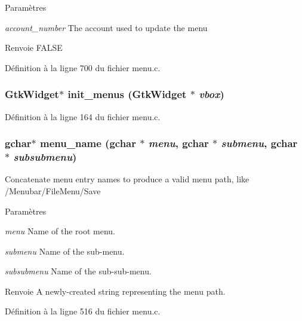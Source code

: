 \begin{DoxyParams}{Paramètres}
\item[{\em account\_\-number}]The account used to update the menu\end{DoxyParams}
\begin{DoxyReturn}{Renvoie}
FALSE 
\end{DoxyReturn}


Définition à la ligne 700 du fichier menu.c.

\subsubsection[{init\_\-menus}]{\setlength{\rightskip}{0pt plus 5cm}GtkWidget$\ast$ init\_\-menus (GtkWidget $\ast$ {\em vbox})}\label{menu_8h_a797e59b4900aa4af71181ca9b7145aa4}


Définition à la ligne 164 du fichier menu.c.

\subsubsection[{menu\_\-name}]{\setlength{\rightskip}{0pt plus 5cm}gchar$\ast$ menu\_\-name (gchar $\ast$ {\em menu}, \/  gchar $\ast$ {\em submenu}, \/  gchar $\ast$ {\em subsubmenu})}\label{menu_8h_a8bf02c2e8820e600ffa71a0ef9f6cce8}
Concatenate menu entry names to produce a valid menu path, like /Menubar/FileMenu/Save


\begin{DoxyParams}{Paramètres}
\item[{\em menu}]Name of the root menu. \item[{\em submenu}]Name of the sub-\/menu. \item[{\em subsubmenu}]Name of the sub-\/sub-\/menu.\end{DoxyParams}
\begin{DoxyReturn}{Renvoie}
A newly-\/created string representing the menu path. 
\end{DoxyReturn}


Définition à la ligne 516 du fichier menu.c.

